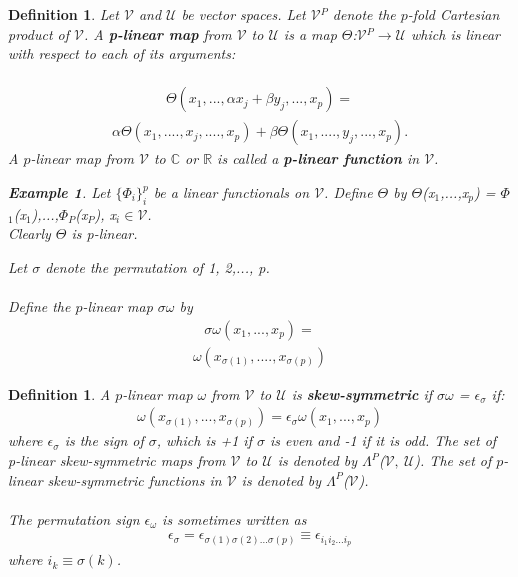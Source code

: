 \documentclass[12pt,a4paper]{article}
\newtheorem{defn}[thm]{Definition}
\newtheorem{exmp}{Example}[section]
\begin{document}
\begin{defn}
Let $\mathcal{V}$ and $\mathcal{U}$ be vector spaces. Let $\mathcal{V}$$^P$ denote the $p$-fold Cartesian product of $\mathcal{V}$. A \textbf{p-linear map} from $\mathcal{V}$ to $\mathcal{U}$ is a map $\Theta$:$\mathcal{V}$$^P$$\to$$\mathcal{U}$ which is linear with respect to each of its arguments:\\\\
\begin{align*}
\Theta(x_1,...,\alpha x_j + \beta y_j,...,x_p)  = 
\end{align*}
\begin{align*}
 \alpha \Theta(x_1,....,x_j,....,x_p) + \beta \Theta(x_1,....,y_j,...,x_p).
\end{align*}
A $p$-linear map from $\mathcal{V}$ to $\mathbb{C}$ or $\mathbb{R}$ is called a \textbf{p-linear function} in $\mathcal{V}$.
\begin{exmp}
Let $\{\Phi_i\}^{p}_{i}$ be a linear functionals on $\mathcal{V}$. Define $\Theta$ by $\Theta$(x$_1$,...,x$_p$) = $\Phi$$_1$(x$_1$),...,$\Phi$$_P$(x$_P$), x$_i$$\in$$\mathcal{V}$.\\
Clearly $\Theta$ is p-linear.
\end{exmp}

Let $\sigma$ denote the permutation of 1, 2,..., p. \\\\Define the $p$-linear map $\sigma$$\omega$ by 
\begin{align*}
\sigma\omega(x_1,...,x_p) =
\end{align*}
\begin{align*}
\omega(x_{\sigma (1)},....,x_{\sigma (p)})
\end{align*}
\end{defn}
\begin{defn}
A $p$-linear map $\omega$ from $\mathcal{V}$ to $\mathcal{U}$ is \textbf{skew-symmetric} if $\sigma\omega$ = $\epsilon_{\sigma}$ if:
\begin{align*}
\omega(x_{\sigma(1)},...,x_{\sigma(p)}) = \epsilon_{\sigma}\omega(x_1,...,x_p)
\end{align*}
where $\epsilon_{\sigma}$ is the sign of $\sigma$, which is +1 if $\sigma$ is even and -1 if it is odd. The set of p-linear skew-symmetric maps from $\mathcal{V}$ to $\mathcal{U}$ is denoted by $\Lambda^{P}$($\mathcal{V},\ \mathcal{U}$). The set of $p$-linear skew-symmetric functions in $\mathcal{V}$ is denoted by $\Lambda^{P}$($\mathcal{V}$).\\\\
\hspace{1cm} The permutation sign $\epsilon_{\omega}$ is sometimes written as \\ 
\begin{align*}
\epsilon_{\sigma} = \epsilon_{\sigma(1)\sigma(2)...\sigma(p)} \equiv \epsilon_{i_{1}i_{2}...i_{p}}
\end{align*}
 where $i_k \equiv \sigma(k)$.
\\
\end{defn}
\end{document}
